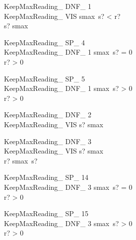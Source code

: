 \documentclass{article}
\begin{document}
\begin{schema}{KeepMaxReading\_ DNF\_ 1}\\
 KeepMaxReading\_ VIS 
\where
 smax~s? < r? \\
 s? \in \dom smax
\end{schema}


\begin{schema}{KeepMaxReading\_ SP\_ 4}\\
 KeepMaxReading\_ DNF\_ 1 
\where
 smax~s? = 0 \\
 r? > 0
\end{schema}


\begin{schema}{KeepMaxReading\_ SP\_ 5}\\
 KeepMaxReading\_ DNF\_ 1 
\where
 smax~s? > 0 \\
 r? > 0
\end{schema}


\begin{schema}{KeepMaxReading\_ DNF\_ 2}\\
 KeepMaxReading\_ VIS 
\where
 s? \notin \dom smax
\end{schema}


\begin{schema}{KeepMaxReading\_ DNF\_ 3}\\
 KeepMaxReading\_ VIS 
\where
 s? \in \dom smax \\
 r? \leq smax~s?
\end{schema}


\begin{schema}{KeepMaxReading\_ SP\_ 14}\\
 KeepMaxReading\_ DNF\_ 3 
\where
 smax~s? = 0 \\
 r? > 0
\end{schema}


\begin{schema}{KeepMaxReading\_ SP\_ 15}\\
 KeepMaxReading\_ DNF\_ 3 
\where
 smax~s? > 0 \\
 r? > 0
\end{schema}
\end{document}

